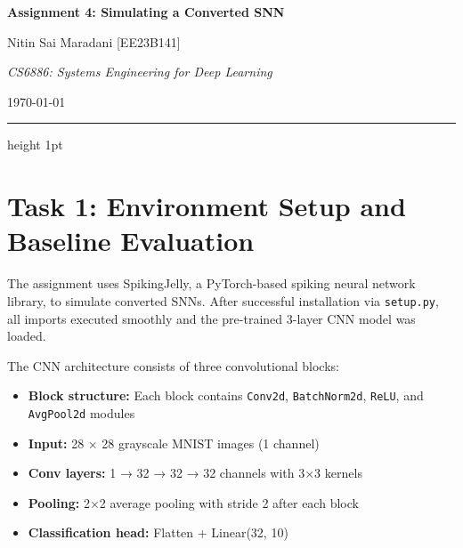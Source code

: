 \documentclass[11pt, a4paper]{article}
\newcommand{\coursecode}{CS6886}
\newcommand{\coursename}{Systems Engineering for Deep Learning}
\newcommand{\assignmentnum}{Assignment 4: Simulating a Converted SNN}
\newcommand{\rollnum}{EE23B141}
\begin{document}
\thispagestyle{firstpage}

\begin{center}
    \vspace*{-4.5em} 
    {\huge \bfseries \color{darkwordblue} \assignmentnum \par} %
    \vspace{1em}
    {\large Nitin Sai Maradani [\rollnum] \par} 
    \vspace{0.5em}
    {\normalsize \textit{\color{wordblue}\coursecode: \coursename} \par} %
    \vspace{0.2em}
    {\normalsize \today \par}
    \vspace{0.25em}
\end{center}


\vspace{-0.5em}
{\color{wordblue}\hrule height 1pt} %
\vspace{1em} %


\section{Task 1: Environment Setup and Baseline Evaluation}

The assignment uses SpikingJelly, a PyTorch-based spiking neural network library, to simulate converted SNNs. After successful installation via \texttt{setup.py}, all imports executed smoothly and the pre-trained 3-layer CNN model was loaded.

The CNN architecture consists of three convolutional blocks:
\begin{itemize}
    \item \textbf{Block structure:} Each block contains \texttt{Conv2d}, \texttt{BatchNorm2d}, \texttt{ReLU}, and \texttt{AvgPool2d} modules
    \item \textbf{Input:} 28 × 28 grayscale MNIST images (1 channel)
    \item \textbf{Conv layers:} 1 → 32 → 32 → 32 channels with 3×3 kernels
    \item \textbf{Pooling:} 2×2 average pooling with stride 2 after each block
    \item \textbf{Classification head:} Flatten + Linear(32, 10)
\end{itemize}
\end{document}
